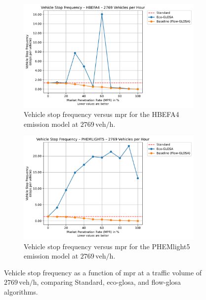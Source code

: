 \begin{figure}[htb]
  \centering
  \begin{subfigure}[b]{0.45\textwidth}
    \includegraphics[width=\textwidth]{data/img/VehicleStopFrequency/VehicleStopFrequency_HBEFA4_Cars2769.pdf}
    \caption{Vehicle stop frequency versus \ac{mpr} for the HBEFA4 emission model at $2769\,\mathrm{veh/h}$.}
    \label{fig:StopFreq_2769_HBEFA4}
  \end{subfigure}\hfill
  \begin{subfigure}[b]{0.45\textwidth}
    \includegraphics[width=\textwidth]{data/img/VehicleStopFrequency/VehicleStopFrequency_PHEMLIGHT5_Cars2769.pdf}
    \caption{Vehicle stop frequency versus \ac{mpr} for the PHEMlight5 emission model at $2769\,\mathrm{veh/h}$.}
    \label{fig:StopFreq_2769_PHEM}
  \end{subfigure}
  \caption{Vehicle stop frequency as a function of \ac{mpr} at a traffic volume of $2769\,\mathrm{veh/h}$, comparing Standard, \ac{eco-glosa}, and \ac{flow-glosa} algorithms.}
  \label{fig:StopFreq_2769}
\end{figure}

